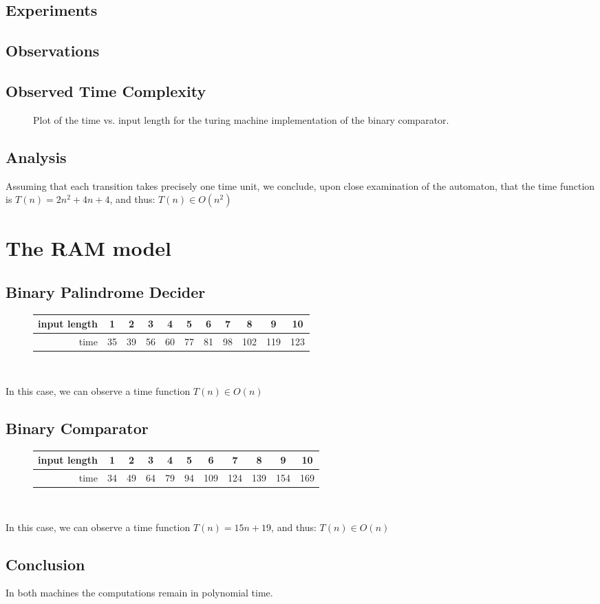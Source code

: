 \documentclass[a4paper]{article}
\begin{document}
        \subsection{Experiments}
        \subsection{Observations}
        
        \subsection{Observed Time Complexity}
            \begin{figure}[!h]
  			\centering
  			\caption{Plot of the time vs. input length for the turing machine implementation of the binary comparator.}
  			\end{figure}
  		\subsection{Analysis}
  		    Assuming that each transition takes precisely one time unit, we conclude, upon close examination of the automaton, that the time function is $ T(n)=2 n^2+4 n+4 $, and thus: $T(n)\in O(n^2)$
    \section{The RAM model}
        \subsection{Binary Palindrome Decider}
            \begin{figure}[!h]
  			\centering
  			\begin{tabular}{r|c|c|c|c|c|c|c|c|c|c|} \hline
  				input length  & 1 & 2 & 3 & 4 & 5 & 6 & 7 & 8 & 9 & 10 \\ \hline
  				time          & 35 & 39 & 56 & 60 & 77 & 81 & 98 & 102 & 119 & 123 \\ \hline
  		    \end{tabular} \\
  		    \end{figure}
  		    In this case, we can observe a time function $ T(n)\in O(n)$
        \subsection{Binary Comparator}
            \begin{figure}[!h]
  			\centering
  			\begin{tabular}{r|c|c|c|c|c|c|c|c|c|c|} \hline
  				input length  & 1 & 2 & 3 & 4 & 5 & 6 & 7 & 8 & 9 & 10 \\ \hline
  				time          & 34 & 49 & 64 & 79 & 94 & 109 & 124 & 139 & 154 & 169 \\ \hline
  		    \end{tabular} \\
  		    \end{figure}
  		    In this case, we can observe a time function $ T(n)=15n+19 $, and thus: $T(n)\in O(n)$
  		\subsection{Conclusion}
  		    In both machines the computations remain in polynomial time.
		
\end{document}
